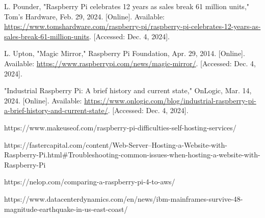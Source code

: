 \documentclass[conference]{IEEEtran}
\begin{document}
\begin{thebibliography}{00}

     L. Pounder, "Raspberry Pi celebrates 12 years as sales break 61 million units," Tom's Hardware, Feb. 29, 2024. [Online]. Available: \url{https://www.tomshardware.com/raspberry-pi/raspberry-pi-celebrates-12-years-as-sales-break-61-million-units}. [Accessed: Dec. 4, 2024].

     L. Upton, "Magic Mirror," Raspberry Pi Foundation, Apr. 29, 2014. [Online]. Available: \url{https://www.raspberrypi.com/news/magic-mirror/}. [Accessed: Dec. 4, 2024].

     "Industrial Raspberry Pi: A brief history and current state," OnLogic, Mar. 14, 2024. [Online]. Available: \url{https://www.onlogic.com/blog/industrial-raspberry-pi-a-brief-history-and-current-state/}. [Accessed: Dec. 4, 2024].

     https://www.makeuseof.com/raspberry-pi-difficulties-self-hosting-services/

     https://fastercapital.com/content/Web-Server--Hosting-a-Website-with-Raspberry-Pi.html\#Troubleshooting-common-issues-when-hosting-a-website-with-Raspberry-Pi

     https://nelop.com/comparing-a-raspberry-pi-4-to-aws/

     https://www.datacenterdynamics.com/en/news/ibm-mainframes-survive-48-magnitude-earthquake-in-us-east-coast/


\end{thebibliography}
\end{document}
